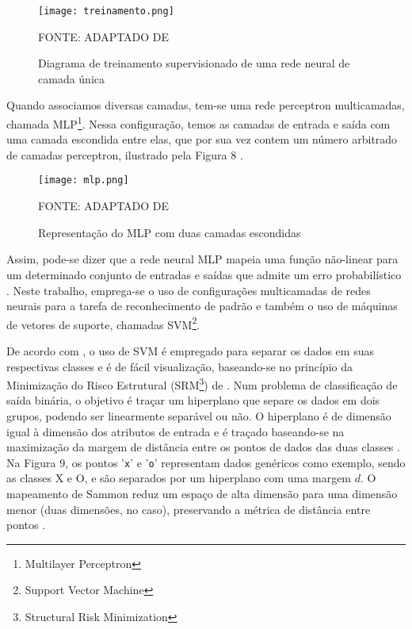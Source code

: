 \documentclass[12pt,oneside,a4paper,chapter=TITLE,section=TITLE,sumario=tradicional,english,brazil]{abntex2}
\begin{document}
\begin{figure}[ht!]
\centering

\caption{Diagrama de treinamento supervisionado de uma rede neural de camada única}
\par
\texttt{[image: treinamento.png]}
\par
\centering
FONTE: ADAPTADO DE \cite{bishop2006}
\end{figure}
\par
Quando associamos diversas camadas, tem-se uma rede perceptron multicamadas,  chamada MLP\footnote{Multilayer Perceptron}. Nessa configuração, temos as camadas de entrada e saída com uma camada escondida entre elas, que por sua vez contem um número arbitrado de camadas perceptron, ilustrado pela Figura 8 \cite{bishop2006}.
\begin{figure}[ht!]
\centering
\caption{Representação do MLP com duas camadas escondidas}
\par
\texttt{[image: mlp.png]}
\par
\centering
FONTE: ADAPTADO DE \cite{bishop2006}
\end{figure}
\newpage 
Assim, pode-se dizer que a rede neural MLP mapeia uma função não-linear para um determinado conjunto de entradas e saídas que admite um erro probabilístico \cite{bishop2006}. Neste trabalho, emprega-se o uso de configurações multicamadas de redes neurais para a tarefa de reconhecimento de padrão e também o uso de máquinas de vetores de suporte, chamadas SVM\footnote{Support Vector Machine}.\par 
De acordo com \textcite{bishop2006}, o uso de SVM é empregado para separar os dados em suas respectivas classes e é de fácil visualização, baseando-se no princípio da Minimização do Risco Estrutural (SRM\footnote{Structural Risk Minimization}) de \textcite{vapnik1998}. Num problema de classificação de saída binária, o objetivo é traçar um hiperplano que separe os dados em dois grupos, podendo ser linearmente separável ou não. O hiperplano é de dimensão igual à dimensão dos atributos de entrada e é traçado baseando-se na maximização da margem de distância entre os pontos de dados das duas classes \cite{bishop2006}. Na Figura 9, os pontos '\texttt{x}' e '\texttt{o}' representam dados genéricos como exemplo, sendo as classes X e O, e são separados por um hiperplano com uma margem $d$. O mapeamento de Sammon reduz um espaço de alta dimensão para uma dimensão menor (duas dimensões, no caso), preservando a métrica de distância entre pontos \cite{sammon1969}.\par 
\end{document}
